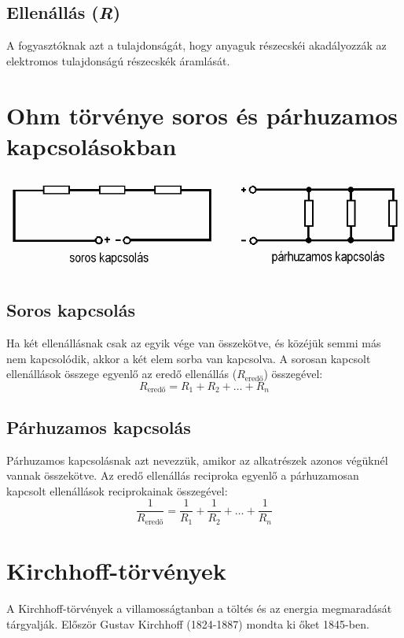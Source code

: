 \documentclass{article}
\begin{document}
\subsection{Ellenállás (\textit{R})}
A fogyasztóknak azt a tulajdonságát, hogy anyaguk részecskéi akadályozzák az elektromos tulajdonságú részecskék áramlását.

\section{Ohm törvénye soros és párhuzamos kapcsolásokban}

\includegraphics[width=\textwidth]{kapcsolasok}

\subsection{Soros kapcsolás}
Ha két ellenállásnak csak az egyik vége van összekötve, és közéjük semmi más nem kapcsolódik, akkor a két elem sorba van kapcsolva. A sorosan kapcsolt ellenállások összege egyenlő az eredő ellenállás ($R_{\text{eredő}}$) összegével:
\begin{equation}
    R_{\text{eredő}} = R_1 + R_2 + \ldots + R_n
\end{equation}

\subsection{Párhuzamos kapcsolás}
Párhuzamos kapcsolásnak azt nevezzük, amikor az alkatrészek azonos végüknél vannak összekötve.
Az eredő ellenállás reciproka egyenlő a párhuzamosan kapcsolt ellenállások reciprokainak összegével:
\begin{equation}
    \frac{1}{R_{\text{eredő}}} = \frac{1}{R_1} + \frac{1}{R_2} + \ldots + \frac{1}{R_n}
\end{equation}
\pagebreak
\section{Kirchhoff-törvények}
A Kirchhoff-törvények a villamosságtanban a töltés és az energia megmaradását tárgyalják. Először Gustav Kirchhoff (1824-1887) mondta ki őket 1845-ben. 
\end{document}
